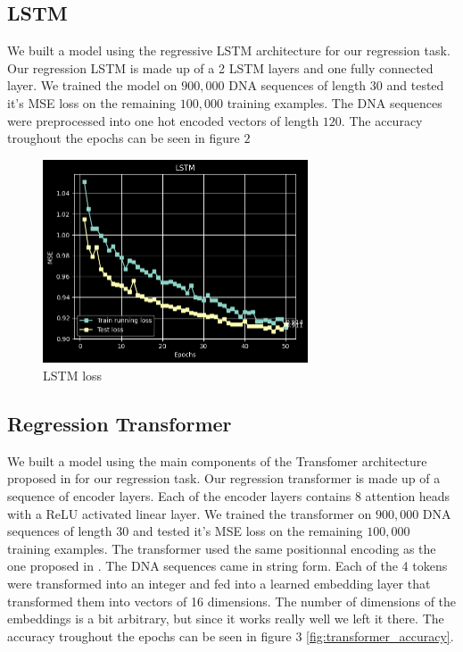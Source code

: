 \documentclass{article}
\begin{document}
\subsection{LSTM}
We built a model using the regressive LSTM architecture for our regression task. Our regression LSTM is made up of a 2 LSTM layers and one fully connected layer. We trained the model on $900, 000$ DNA sequences of length $30$ and tested it's MSE loss on the remaining $100,000$ training examples. The DNA sequences were preprocessed into one hot encoded vectors of length $120$. The accuracy troughout the epochs can be seen in figure $2$
\begin{figure} \label{fig:lstm}
    \caption{LSTM loss} \center
    \includegraphics[width=0.7\textwidth]{images/lstm.png}
\end{figure}

\subsection{Regression Transformer}
We built a model using the main components of the Transfomer architecture proposed in \cite{transformers} for our regression task. Our regression transformer is made up of a sequence of encoder layers. Each of the encoder layers contains 8 attention heads with a ReLU activated linear layer. We trained the transformer on $900, 000$ DNA sequences of length $30$ and tested it's MSE loss on the remaining $100,000$ training examples. The transformer used the same positionnal encoding as the one proposed in \cite{transformers}. The DNA sequences came in string form. Each of the 4 tokens were transformed into an integer and fed into a learned embedding layer that transformed them into vectors of 16 dimensions. The number of dimensions of the embeddings is a bit arbitrary, but since it works really well we left it there. The accuracy troughout the epochs can be seen in figure $3$ \ref{fig:transformer_accuracy}. 
\end{document}
